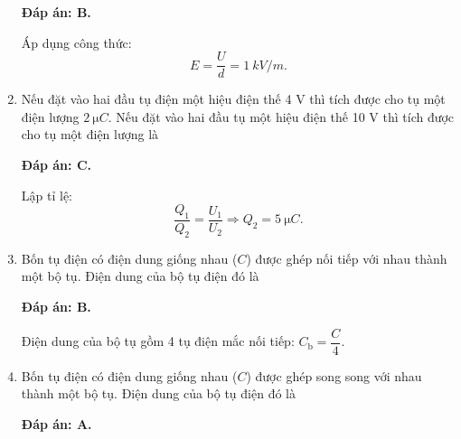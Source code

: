 \begin{enumerate}[label=\bfseries Câu \arabic*:]
{	}
	\loigiai
	{	\textbf{Đáp án: B.}
		
		Áp dụng công thức:
		$$E=\dfrac{U}{d} = \SI{1}{kV/m}.$$
	}
	\item {}
	
	\cauhoi
	{Nếu đặt vào hai đầu tụ điện một hiệu điện thế 4 V thì tích được cho tụ một điện lượng $\SI{2}{\micro C}$. Nếu đặt vào hai đầu tụ một hiệu điện thế 10 V thì tích được cho tụ một điện lượng là
		
	}
	\loigiai
	{	\textbf{Đáp án: C.}
		
		Lập tỉ lệ:
		$$\dfrac{Q_1}{Q_2} = \dfrac{U_1}{U_2} \Rightarrow Q_2 = \SI{5}{\micro C}.$$
	}
	\item {}
	
	\cauhoi
	{Bốn tụ điện có điện dung giống nhau ($C$) được ghép nối tiếp với nhau thành một bộ tụ. Điện dung của bộ tụ điện đó là
		
	}
	\loigiai
	{	\textbf{Đáp án: B.}
		
		Điện dung của bộ tụ gồm 4 tụ điện mắc nối tiếp: $C_\text{b} = \dfrac{C}{4}$.
	}
	\item {}
	
	\cauhoi
	{Bốn tụ điện có điện dung giống nhau ($C$) được ghép song song với nhau thành một bộ tụ. Điện dung của bộ tụ điện đó là
		
	}
	\loigiai
	{	\textbf{Đáp án: A.}
		
}
\end{enumerate}
